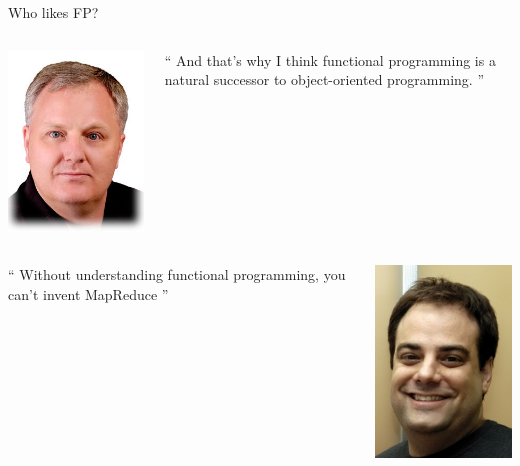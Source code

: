 \documentclass[mathserif]{beamer}
\begin{document}
\begin{frame}{Who likes FP?}
  \begin{columns}[t]
    \begin{column}[T]{2cm}
      \includegraphics[scale=0.2]{img/dave_thomas.jpg}
    \end{column}

    \begin{column}[T]{8cm}
      {\large ``
        And that’s why I think functional programming is a natural successor to object-oriented programming.
        ''}
      \vskip5mm
      \hspace*{}
    \end{column}
  \end{columns}

  \vskip5mm

  \begin{columns}[t]
    \begin{column}[T]{8cm}
      {\large ``
        Without understanding functional programming, you can't invent MapReduce
        ''}
      \vskip5mm
      \hspace*{}
    \end{column}

    \begin{column}[T]{2cm}
      \includegraphics[scale=0.2]{img/spolsky.jpg}
    \end{column}


\end{columns}
\end{frame}
\end{document}
